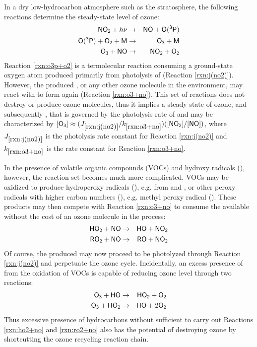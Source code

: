In a dry low-hydrocarbon atmosphere such as the stratosphere, the following reactions determine the steady-state level of ozone:
\begin{eqnarray}
	\chem{NO_2} + h\nu &\rightarrow& \chem{NO} + \chem{O(^3P}) \label{rxn:j(no2)} \\
	\chem{O(^3P)} + \chem{O_2} + \chem{M} &\rightarrow& \chem{O_3} + \chem{M} \label{rxn:o3p+o2} \\
	\chem{O_3} + \chem{NO} &\rightarrow& \chem{NO_2} + \chem{O_2} \label{rxn:o3+no}
\end{eqnarray}
Reaction \ref{rxn:o3p+o2} is a termolecular reaction consuming a ground-state oxygen atom produced primarily from photolysis of  (Reaction \ref{rxn:j(no2)}). However, the produced , or any other ozone molecule in the environment, may react with  to form  again (Reaction \ref{rxn:o3+no}). This set of reactions does not destroy or produce ozone molecules, thus it implies a steady-state of ozone, and subsequently , that is governed by the photolysis rate of  and may be characterized by $[\chem{O_3}] \approx (J_{\ref{rxn:j(no2)}}/k_{\ref{rxn:o3+no}})([\chem{NO_2}]/[\chem{NO}])$, where $J_{\ref{rxn:j(no2)}}$ is the photolysis rate constant for Reaction \ref{rxn:j(no2)} and $k_{\ref{rxn:o3+no}}$ is the rate constant for Reaction \ref{rxn:o3+no}.

In the presence of volatile organic compounds (VOCs) and hydroxy radicals (), however, the reaction set becomes much more complicated. VOCs may be oxidized to produce hydroperoxy radicals (), e.g. from  and , or other peroxy radicals with higher carbon numbers (), e.g. methyl peroxy radical (). These products may then compete with Reaction \ref{rxn:o3+no} to consume the available  without the cost of an ozone molecule in the process:
\begin{eqnarray}
	\chem{HO_2} + \chem{NO} &\rightarrow& \chem{HO} + \chem{NO_2} \label{rxn:ho2+no} \\
	\chem{RO_2} + \chem{NO} &\rightarrow& \chem{RO} + \chem{NO_2} \label{rxn:ro2+no}
\end{eqnarray}
Of course, the produced  may now proceed to be photolyzed through Reaction \ref{rxn:j(no2)} and perpetuate the ozone cycle. Incidentally, an excess presence of  from the oxidation of VOCs is capable of reducing ozone level through two reactions:
\begin{eqnarray}
	\chem{O_3} + \chem{HO} &\rightarrow& \chem{HO_2} + \chem{O_2} \label{rxn:o3+ho} \\
	\chem{O_3} + \chem{HO_2} &\rightarrow& \chem{HO} + 2\chem{O_2} \label{rxn:o3+ho2}
\end{eqnarray}
Thus excessive presence of hydrocarbons without sufficient  to carry out Reactions \ref{rxn:ho2+no} and \ref{rxn:ro2+no} also has the potential of destroying ozone by shortcutting the ozone recycling reaction chain.

